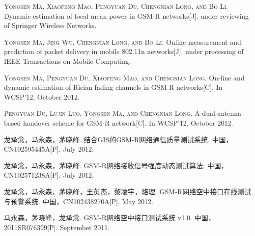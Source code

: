 
\begin{publications}{99}

    \item\textsc{Yongsen Ma, Xiaofeng Mao, Pengyuan Du, Chengnian Long, and Bo Li}. {Dynamic estimation of local mean power in GSM-R networks}[J]. under reviewing of Springer Wireless Networks.

    \item\textsc{Yongsen Ma, Jing Wu, Chengnian Long, and Bo Li}. {Online measurement and prediction of packet delivery in mobile 802.11n networks}[J]. under processing of IEEE Transactions on Mobile Computing.

    \item\textsc{Yongsen Ma, Pengyuan Du, Xiaofeng Mao, and Chengnian Long}. {On-line and dynamic estimation of Rician fading channels in GSM-R networks}[C]. In WCSP’12, October 2012.

    \item\textsc{Pengyuan Du, Lujin Luo, Yongsen Ma, and Chengnian Long}. {A dual-antenna based handover scheme for GSM-R network}[C]. In WCSP’12, October 2012.

    \item\textsc{龙承念，马永森，茅晓峰}. {结合GIS的GSM-R网络通信质量测试系统}. {中国，CN102595445A}[P]. July 2012.

    \item\textsc{龙承念，马永森，茅晓峰}. {GSM-R网络接收信号强度动态测试算法}. {中国，CN102571238A}[P]. July 2012.

    \item\textsc{龙承念，马永森，茅晓峰，王英杰，黎凌宇，骆理}. {GSM-R网络空中接口在线测试与预警系统}. {中国，CN102438270A}[P]. May 2012.

    \item\textsc{马永森，茅晓峰，龙承念}. {GSM-R网络空中接口测试系统 v1.0}. {中国，2011SR076399}[P]. September 2011.
\end{publications}
